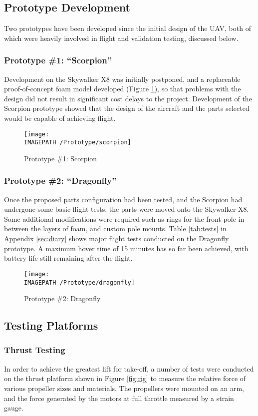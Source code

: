 \subsection{Prototype Development}
Two prototypes have been developed since the initial design of the UAV, both of which were heavily involved in flight and validation testing, discussed below.

\subsubsection*{Prototype \#1: ``Scorpion''}
Development on the Skywalker X8 was initially postponed, and a replaceable proof-of-concept foam model developed (Figure \ref{fig:scorpion}), so that problems with the design did not result in significant cost delays to the project. Development of the Scorpion prototype showed that the design of the aircraft and the parts selected would be capable of achieving flight.

\begin{figure}[!ht]
	\centering
	\texttt{[image: \\IMAGEPATH /Prototype/scorpion]}
	\caption{Prototype \#1: Scorpion }
	\label{fig:scorpion}
\end{figure}

\subsubsection*{Prototype \#2: ``Dragonfly''}
Once the proposed parts configuration had been tested, and the Scorpion had undergone some basic flight tests, the parts were moved onto the Skywalker X8. Some additional modifications were required such as rings for the front pole in between the layers of foam, and custom pole mounts. Table \ref{tab:tests} in Appendix \ref{sec:diary} shows major flight tests conducted on the Dragonfly prototype. A maximum hover time of 15 minutes has so far been achieved, with battery life still remaining after the flight.  

\begin{figure}[!ht]
	\centering
	\texttt{[image: \\IMAGEPATH /Prototype/dragonfly]}
	\caption{Prototype \#2: Dragonfly }
	\label{fig:dragonfly}
\end{figure}

\subsection{Testing Platforms}
\subsubsection*{Thrust Testing}
\label{sec:thrust}
In order to achieve the greatest lift for take-off, a number of tests were conducted on the thrust platform shown in Figure \ref{fig:rig} to measure the relative force of various propeller sizes and materials. The propellers were mounted on an arm, and the force generated by the motors at full throttle measured by a strain gauge.\\

